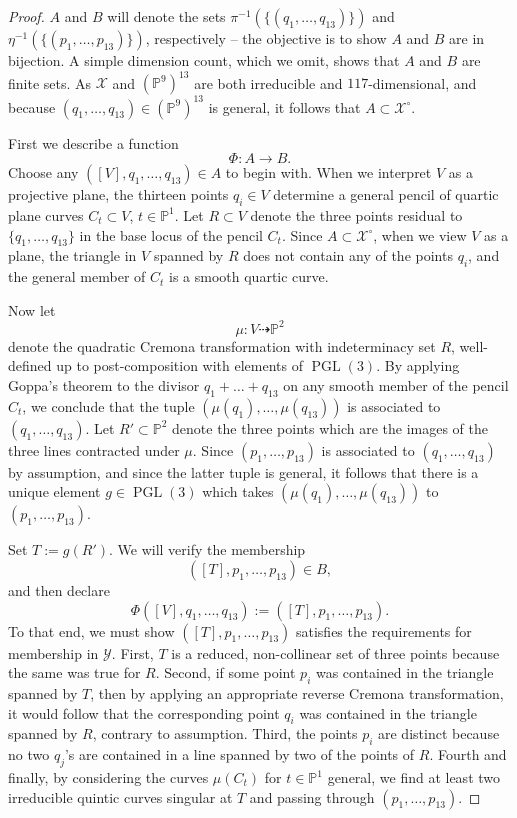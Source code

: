 \documentclass[reqno, 11pt]{amsart}
\theoremstyle{plain}
\theoremstyle{remark}
\renewcommand{\P}{\mathbb{P}}
\DeclareMathOperator{\PGL}{PGL}
\begin{document}
\begin{proof}
    $A$ and $B$ will denote the sets $\pi^{-1}(\{(q_{1}, \dots, q_{13})\})$ and $\eta^{-1}(\{(p_{1}, \dots, p_{13})\})$, respectively -- the objective is to show $A$ and $B$ are in bijection.  A simple dimension count, which we omit, shows that $A$ and $B$ are finite sets.  As $\mathcal{X}$ and $(\P^{9})^{13}$ are both  irreducible and $117$-dimensional, and because $(q_{1}, \dots, q_{13}) \in (\P^{9})^{13}$ is general, it follows that $A \subset \mathcal{X}^{\circ}$. 
    
    First we describe a function $$\Phi: A \to B.$$ Choose any $([V],q_{1}, \dots, q_{13}) \in A$ to begin with. When we interpret $V$ as a projective plane, the thirteen points $q_{i} \in V$ determine a general pencil of quartic plane curves $C_{t} \subset V$, $t \in \P^{1}$. Let $R \subset V$ denote the three points residual to $\{q_{1}, \dots, q_{13}\}$ in the base locus of the pencil $C_{t}$.  Since $A \subset \mathcal{X}^{\circ}$, when we view $V$ as a plane, the triangle in $V$ spanned by $R$ does not contain any of the points $q_{i}$, and the general member of $C_{t}$ is a smooth quartic curve.  

    Now let $$\mu: V \dashrightarrow \P^{2}$$ denote the quadratic Cremona transformation with indeterminacy set $R$, well-defined up to post-composition with elements of $\PGL(3)$. By applying Goppa's theorem to the divisor $q_{1} + \dots + q_{13}$ on any smooth member of the pencil $C_{t}$, we conclude that the tuple $(\mu(q_{1}), \dots, \mu(q_{13}))$ is associated to $(q_{1}, \dots, q_{13}).$  Let $R' \subset \P^{2}$ denote the three points which are the images of the three lines contracted under $\mu$.  Since $(p_{1}, \dots, p_{13})$ is associated to $(q_{1}, \dots, q_{13})$ by assumption, and since the latter tuple is general, it follows that there is a unique element  $g \in \PGL(3)$ which takes $(\mu(q_{1}), \dots, \mu(q_{13}))$ to $(p_{1}, \dots, p_{13})$. 
    
    Set $T := g (R')$. We will verify the membership $$([T],p_{1}, \dots, p_{13}) \in B,$$ and then declare $$\Phi([V],q_{1}, \dots, q_{13}) := ([T],p_{1}, \dots, p_{13}).$$  To that end, we must show $([T],p_{1}, \dots, p_{13})$ satisfies the requirements for membership in  $\mathcal{Y}.$ First, $T$ is a reduced, non-collinear set of three points because the same was true for $R$. Second, if some point  $p_{i}$ was contained in the triangle spanned by $T$, then by applying an appropriate reverse Cremona transformation, it would follow that the corresponding point $q_{i}$ was contained in the triangle spanned by $R$, contrary to assumption. Third, the points $p_{i}$ are distinct because no two $q_{j}$'s are contained in a line spanned by two of the points of $R$. Fourth and finally, by considering the curves $\mu(C_{t})$ for $t \in \P^{1}$ general, we find at least two irreducible quintic curves singular at $T$ and passing through $(p_{1}, \dots, p_{13})$. 


\end{proof}
\end{document}

